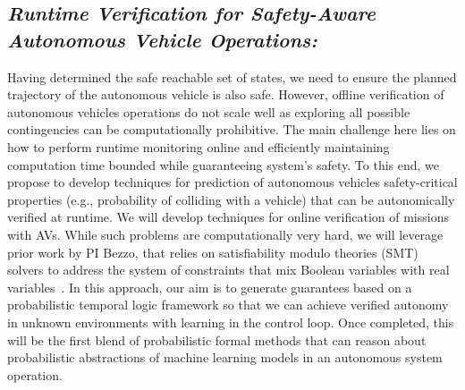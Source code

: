 \subsection{\em Runtime Verification for Safety-Aware Autonomous Vehicle Operations:}
\label{subsec:runtime}
Having determined the safe reachable set of states, we need to ensure the planned trajectory of the autonomous vehicle is also safe. 
However, offline verification of autonomous vehicles operations do not scale well as exploring all possible contingencies can be computationally prohibitive. 
The main challenge here lies on how to perform runtime monitoring online and efficiently maintaining computation time bounded while guaranteeing system's safety.   To this end, we propose to develop techniques for prediction of autonomous vehicles safety-critical properties (e.g., probability of colliding with a vehicle) that can be autonomically verified at runtime.  
We will develop techniques for online verification of missions with AVs. While such problems are computationally very hard, we will leverage prior work by PI Bezzo, that relies on satisfiability modulo theories (SMT) solvers to address the system of constraints that mix Boolean variables with real variables~\cite{shoukry2015secure, bezzo2015idetc}. 
In this approach, our aim is to generate guarantees based on a probabilistic temporal logic framework so that we can achieve verified autonomy in unknown environments with learning in the control loop.  Once completed, this will be the first blend of probabilistic formal methods that can reason about probabilistic abstractions of machine learning models in an autonomous system operation.  
